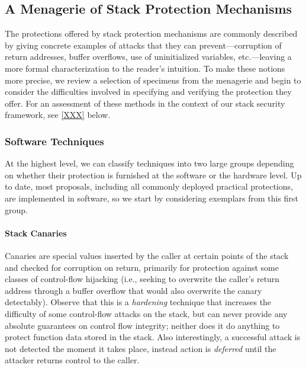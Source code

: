 \subsection{A Menagerie of Stack Protection Mechanisms}


The protections offered by stack protection mechanisms are commonly described by giving
concrete examples of attacks that they can prevent---corruption of return
addresses, buffer overflows, use of uninitialized variables, etc.---leaving
a more formal characterization to the reader's intuition.
%
To make these notions more precise, we review a selection of specimens from the
menagerie and begin to consider the difficulties involved in specifying and
verifying the protection they offer.
%
For an assessment of these methods in the context of our stack security
framework, see \cref{XXX} below.

\subsubsection{Software Techniques}

At the highest level, we can classify techniques into two large groups depending
on whether their protection is furnished at the software or the hardware level.
Up to date, most proposals, including all commonly deployed practical
protections, are implemented in software, so we start by considering exemplars
from this first group.

\paragraph{Stack Canaries}
%
Canaries are special values inserted by the caller at certain points of the
stack and checked for corruption on return, primarily for protection against
some classes of control-flow hijacking (i.e., seeking to overwrite the caller's
return address through a buffer overflow that would also overwrite the canary
detectably).
%
Observe that this is a \emph{hardening} technique that increases the difficulty
of some control-flow attacks on the stack, but can never provide any absolute
guarantees on control flow integrity; neither does it do anything to protect
function data stored in the stack.
%
Also interestingly, a successful attack is not detected the moment it takes
place, instead action is \emph{deferred} until the attacker returns control to
the caller.

